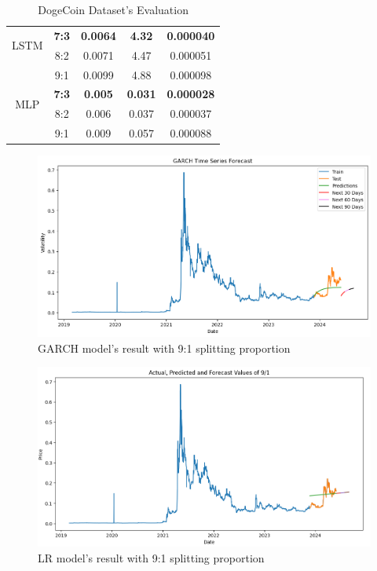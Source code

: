 \documentclass{ieeeojies}
\begin{document}
\begin{table}[H]
\begin{tabular}{|c|c|c|c|c|}
    \hline
    \multirow{2}{*}{LSTM}  & \textbf{7:3}     & \textbf{0.0064} & \textbf{4.32}  & \textbf{0.000040} \\ & 8:2 & 0.0071 & 4.47 &  0.000051 \\ & 9:1&  0.0099 &4.88 & 0.000098\\
    \hline
    \multirow{2}{*}{MLP}   & \textbf{7:3}     & \textbf{0.005}  & \textbf{0.031} & \textbf{0.000028} \\ & 8:2 & 0.006 &  0.037 &  0.000037 \\ & 9:1 & 0.009 & 0.057 & 0.000088\\
    \hline
  \end{tabular}
  \caption{DogeCoin Dataset's Evaluation}
  \label{dogecoinresult}
\end{table}
\vspace{-5mm}
\begin{figure}[H]
  \centering
  \begin{minipage}{0.8\linewidth}
    \centering
    \includegraphics[width=\linewidth]{Image/Garch/GARCH_Dogecoin91.png}
    \caption{GARCH model's result with 9:1 splitting proportion}
    \label{fig:23}
  \end{minipage}
\end{figure}
\vspace{-5mm}
\begin{figure}[H]
  \centering
  \begin{minipage}{0.8\linewidth}
    \centering
    \includegraphics[width=\linewidth]{Image/LN/LN_DOGE_91.png}
    \caption{LR model's result with 9:1 splitting proportion}
    \label{fig:24}
  \end{minipage}
\end{figure}
\end{document}
